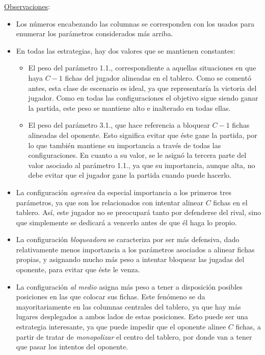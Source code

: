 \documentclass[12pt,a4paper]{article}
\begin{document}
    \underline{Observaciones}:
        \begin{itemize}
            \item Los números encabezando las columnas se corresponden con los usados para enumerar los parámetros considerados más arriba.
            \item En todas las estrategias, hay dos valores que se mantienen constantes:
                \begin{itemize}
                    \item El peso del parámetro 1.1., correspondiente a aquellas situaciones en que haya $C-1$ fichas del jugador alineadas en el tablero. Como se comentó antes, esta clase de escenario es ideal, ya que representaría la victoria del jugador. Como en todas las configuraciones el objetivo sigue siendo ganar la partida, este peso se mantiene alto e inalterado en todas ellas.
                    \item El peso del parámetro 3.1., que hace referencia a bloquear $C-1$ fichas alineadas del oponente. Esto significa evitar que éste gane la partida, por lo que también mantiene su importancia a través de todas las configuraciones. En cuanto a su valor, se le asignó la tercera parte del valor asociado al parámetro 1.1., ya que su importancia, aunque alta, no debe evitar que el jugador gane la partida cuando puede hacerlo.
                \end{itemize}
            \item La configuración \textit{agresiva} da especial importancia a los primeros tres parámetros, ya que son los relacionados con intentar alinear $C$ fichas en el tablero. Así, este jugador no se preocupará tanto por defenderse del rival, sino que simplemente se dedicará a vencerlo antes de que él haga lo propio.
            \item La configuración \textit{bloqueadora} se caracteriza por ser más defensiva, dado relativamente menos importancia a los parámetros asociados a alinear fichas propias, y asignando mucho más peso a intentar bloquear las jugadas del oponente, para evitar que éste le venza.
            \item La configuración \textit{al medio} asigna más peso a tener a disposición posibles posiciones en las que colocar sus fichas. Este fenómeno se da mayoritariamente en las columnas centrales del tablero, ya que hay más lugares desplegados a ambos lados de estas posiciones. Esto puede ser una estrategia interesante, ya que puede impedir que el oponente alinee $C$ fichas, a partir de tratar de \textit{monopolizar} el centro del tablero, por donde van a tener que pasar los intentos del oponente.
        \end{itemize}
\end{document}
